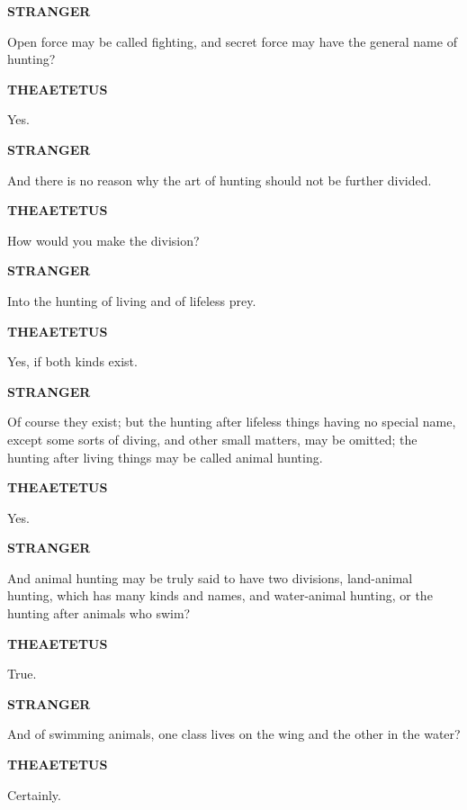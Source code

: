 \documentclass[11pt,letter]{article}
\begin{document}
\par \textbf{STRANGER}
\par   Open force may be called fighting, and secret force may have the general name of hunting?

\par \textbf{THEAETETUS}
\par   Yes.

\par \textbf{STRANGER}
\par   And there is no reason why the art of hunting should not be further divided.

\par \textbf{THEAETETUS}
\par   How would you make the division?

\par \textbf{STRANGER}
\par   Into the hunting of living and of lifeless prey.

\par \textbf{THEAETETUS}
\par   Yes, if both kinds exist.

\par \textbf{STRANGER}
\par   Of course they exist; but the hunting after lifeless things having no special name, except some sorts of diving, and other small matters, may be omitted; the hunting after living things may be called animal hunting.

\par \textbf{THEAETETUS}
\par   Yes.

\par \textbf{STRANGER}
\par   And animal hunting may be truly said to have two divisions, land-animal hunting, which has many kinds and names, and water-animal hunting, or the hunting after animals who swim?

\par \textbf{THEAETETUS}
\par   True.

\par \textbf{STRANGER}
\par   And of swimming animals, one class lives on the wing and the other in the water?

\par \textbf{THEAETETUS}
\par   Certainly.
\end{document}
